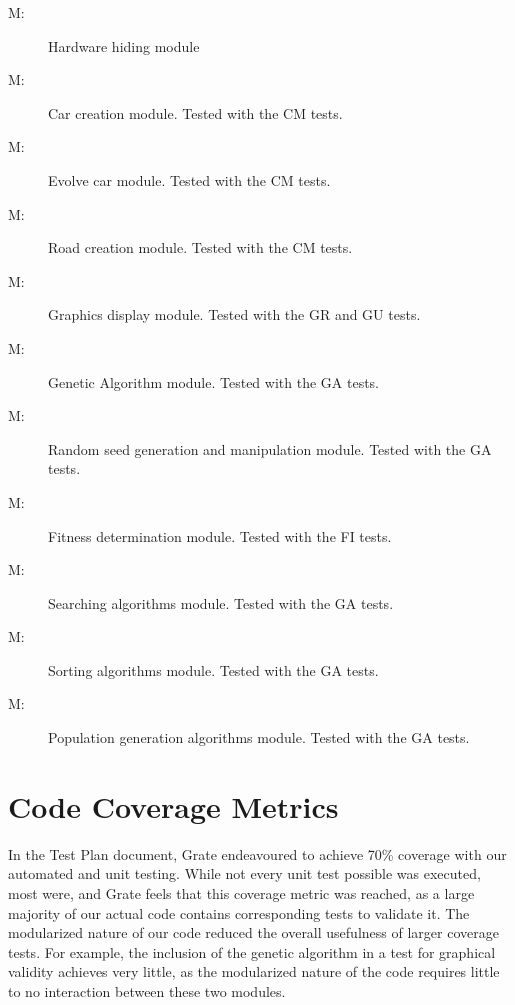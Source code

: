\documentclass[12pt, titlepage]{article}
\newcounter{mnum}
\newcommand{\mthemnum}{M\themnum}
\begin{document}
\begin{description}
\item [ \mthemnum \label{mHardware}:] Hardware hiding 
module
\item [ \mthemnum \label{mCreateCar}:]  Car creation 
module. Tested with the CM tests.
\item [ \mthemnum \label{mEvolveCar}:] Evolve car module. 
Tested with the CM tests.
\item [ \mthemnum \label{mCreateRoad}:] Road creation 
module. Tested with the CM tests.
\item [ \mthemnum \label{mGraphicsDisplay}:] Graphics 
display module. Tested with the GR and GU tests.
\item [ \mthemnum \label{mGeneticAlgorithm}:] Genetic 
Algorithm module. Tested with the GA tests.
\item [ \mthemnum \label{mRandomSeed}:] Random seed 
generation and manipulation module. Tested with the GA tests.
\item [ \mthemnum \label{mFitness}:] Fitness determination 
module. Tested with the FI tests.
\item [ \mthemnum \label{mSearching}:] Searching algorithms 
module. Tested with the GA tests.
\item [ \mthemnum \label{mSorting}:] Sorting algorithms 
module. Tested with the GA tests.
\item [ \mthemnum \label{mPopulationGeneration}:] 
Population generation algorithms module. Tested with the GA tests.
\end{description}


\section{Code Coverage Metrics}

In the Test Plan document, Grate endeavoured to achieve 70\% coverage with our 
automated and unit testing. While not every unit test possible was executed, 
most were, and Grate feels that this coverage metric was reached, as a large 
majority of our actual code contains corresponding tests to validate it. The 
modularized nature of our code reduced the overall usefulness of larger coverage 
tests. For example, the inclusion of the genetic algorithm in a test for 
graphical validity achieves very little, as the modularized nature of the code 
requires little to no interaction between these two modules.
\end{document}
